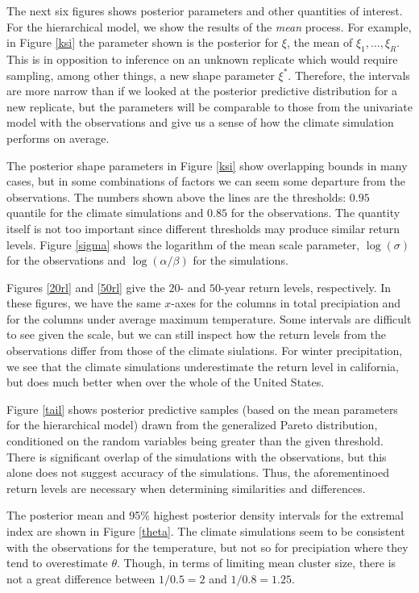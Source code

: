 \documentclass[12pt]{article}
\begin{document}
The next six figures shows posterior parameters and other quantities of interest. For the hierarchical model, we show the results of the \emph{mean} process. For example, in Figure \ref{ksi} the parameter shown is the posterior for $\xi$, the mean of $\xi_1,\ldots,\xi_R$. This is in opposition to inference on an unknown replicate which would require sampling, among other things, a new shape parameter $\xi^*$. Therefore, the intervals are more narrow than if we looked at the posterior predictive distribution for a new replicate, but the parameters will be comparable to those from the univariate model with the observations and give us a sense of how the climate simulation performs on average.

The posterior shape parameters in Figure \ref{ksi} show overlapping bounds in many cases, but in some combinations of factors we can seem some departure from the observations. The numbers shown above the lines are the thresholds: $0.95$ quantile for the climate simulations and $0.85$ for the observations. The quantity itself is not too important since different thresholds may produce similar return levels. Figure \ref{sigma} shows the logarithm of the mean scale parameter, $\log(\sigma)$ for the observations and $\log(\alpha/\beta)$ for the simulations.

Figures \ref{20rl} and \ref{50rl} give the $20$- and $50$-year return levels, respectively. In these figures, we have the same $x$-axes for the columns in total precipiation and for the columns under average maximum temperature. Some intervals are difficult to see given the scale, but we can still inspect how the return levels from the observations differ from those of the climate siulations. For winter precipitation, we see that the climate simulations underestimate the return level in california, but does much better when over the whole of the United States.

Figure \ref{tail} shows posterior predictive samples (based on the mean parameters for the hierarchical model) drawn from the generalized Pareto distribution, conditioned on the random variables being greater than the given threshold. There is significant overlap of the simulations with the observations, but this alone does not suggest accuracy of the simulations. Thus, the aforementinoed return levels are necessary when determining similarities and differences.

The posterior mean and 95\% highest posterior density intervals for the extremal index are shown in Figure \ref{theta}. The climate simulations seem to be consistent with the observations for the temperature, but not so for precipiation where they tend to overestimate $\theta$. Though, in terms of limiting mean cluster size, there is not a great difference between $1/0.5=2$ and $1/0.8=1.25$.
\end{document}
